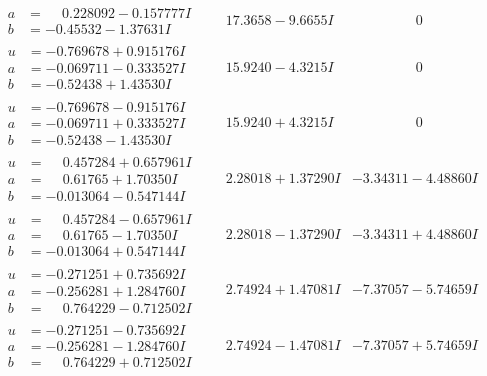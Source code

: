 \documentclass[1p]{elsarticle_modified}
\theoremstyle{definition}
\begin{document}
$$\begin{array}{c|c|c}
\begin{aligned}
a &= \phantom{-}0.228092 - 0.157777 I \\
b &= -0.45532 - 1.37631 I\end{aligned}
 & \phantom{-}17.3658 - 9.6655 I & \phantom{-0.000000 } 0 \\ \hline\begin{aligned}
u &= -0.769678 + 0.915176 I \\
a &= -0.069711 - 0.333527 I \\
b &= -0.52438 + 1.43530 I\end{aligned}
 & \phantom{-}15.9240 - 4.3215 I & \phantom{-0.000000 } 0 \\ \hline\begin{aligned}
u &= -0.769678 - 0.915176 I \\
a &= -0.069711 + 0.333527 I \\
b &= -0.52438 - 1.43530 I\end{aligned}
 & \phantom{-}15.9240 + 4.3215 I & \phantom{-0.000000 } 0 \\ \hline\begin{aligned}
u &= \phantom{-}0.457284 + 0.657961 I \\
a &= \phantom{-}0.61765 + 1.70350 I \\
b &= -0.013064 - 0.547144 I\end{aligned}
 & \phantom{-}2.28018 + 1.37290 I & -3.34311 - 4.48860 I \\ \hline\begin{aligned}
u &= \phantom{-}0.457284 - 0.657961 I \\
a &= \phantom{-}0.61765 - 1.70350 I \\
b &= -0.013064 + 0.547144 I\end{aligned}
 & \phantom{-}2.28018 - 1.37290 I & -3.34311 + 4.48860 I \\ \hline\begin{aligned}
u &= -0.271251 + 0.735692 I \\
a &= -0.256281 + 1.284760 I \\
b &= \phantom{-}0.764229 - 0.712502 I\end{aligned}
 & \phantom{-}2.74924 + 1.47081 I & -7.37057 - 5.74659 I \\ \hline\begin{aligned}
u &= -0.271251 - 0.735692 I \\
a &= -0.256281 - 1.284760 I \\
b &= \phantom{-}0.764229 + 0.712502 I\end{aligned}
 & \phantom{-}2.74924 - 1.47081 I & -7.37057 + 5.74659 I\\

\end{array}$$
\end{document}
